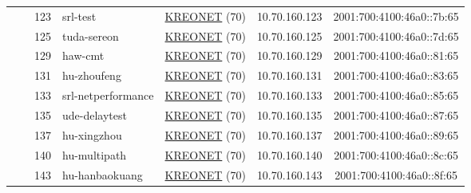 \begin{small}
\begin{center}
\begin{longtable}{|c|c|c|c|c|c|c|c|}
  &  & \tiny{123} & \multicolumn{1}{|l|}{\tiny{srl-test}} & \multicolumn{2}{|c|}{\tiny{\href{http://www.kreonet.net}{KREONET} (70)}} & \tiny{10.70.160.123} & \tiny{2001:700:4100:46a0::7b:65} \\* \cline{3-3}\cline{4-4}\cline{5-5}\cline{6-6}\cline{7-7}\cline{8-8}
  &  & \tiny{125} & \multicolumn{1}{|l|}{\tiny{tuda-sereon}} & \multicolumn{2}{|c|}{\tiny{\href{http://www.kreonet.net}{KREONET} (70)}} & \tiny{10.70.160.125} & \tiny{2001:700:4100:46a0::7d:65} \\* \cline{3-3}\cline{4-4}\cline{5-5}\cline{6-6}\cline{7-7}\cline{8-8}
  &  & \tiny{129} & \multicolumn{1}{|l|}{\tiny{haw-cmt}} & \multicolumn{2}{|c|}{\tiny{\href{http://www.kreonet.net}{KREONET} (70)}} & \tiny{10.70.160.129} & \tiny{2001:700:4100:46a0::81:65} \\* \cline{3-3}\cline{4-4}\cline{5-5}\cline{6-6}\cline{7-7}\cline{8-8}
  &  & \tiny{131} & \multicolumn{1}{|l|}{\tiny{hu-zhoufeng}} & \multicolumn{2}{|c|}{\tiny{\href{http://www.kreonet.net}{KREONET} (70)}} & \tiny{10.70.160.131} & \tiny{2001:700:4100:46a0::83:65} \\* \cline{3-3}\cline{4-4}\cline{5-5}\cline{6-6}\cline{7-7}\cline{8-8}
  &  & \tiny{133} & \multicolumn{1}{|l|}{\tiny{srl-netperformance}} & \multicolumn{2}{|c|}{\tiny{\href{http://www.kreonet.net}{KREONET} (70)}} & \tiny{10.70.160.133} & \tiny{2001:700:4100:46a0::85:65} \\* \cline{3-3}\cline{4-4}\cline{5-5}\cline{6-6}\cline{7-7}\cline{8-8}
  &  & \tiny{135} & \multicolumn{1}{|l|}{\tiny{ude-delaytest}} & \multicolumn{2}{|c|}{\tiny{\href{http://www.kreonet.net}{KREONET} (70)}} & \tiny{10.70.160.135} & \tiny{2001:700:4100:46a0::87:65} \\* \cline{3-3}\cline{4-4}\cline{5-5}\cline{6-6}\cline{7-7}\cline{8-8}
  &  & \tiny{137} & \multicolumn{1}{|l|}{\tiny{hu-xingzhou}} & \multicolumn{2}{|c|}{\tiny{\href{http://www.kreonet.net}{KREONET} (70)}} & \tiny{10.70.160.137} & \tiny{2001:700:4100:46a0::89:65} \\* \cline{3-3}\cline{4-4}\cline{5-5}\cline{6-6}\cline{7-7}\cline{8-8}
  &  & \tiny{140} & \multicolumn{1}{|l|}{\tiny{hu-multipath}} & \multicolumn{2}{|c|}{\tiny{\href{http://www.kreonet.net}{KREONET} (70)}} & \tiny{10.70.160.140} & \tiny{2001:700:4100:46a0::8c:65} \\* \cline{3-3}\cline{4-4}\cline{5-5}\cline{6-6}\cline{7-7}\cline{8-8}
  &  & \tiny{143} & \multicolumn{1}{|l|}{\tiny{hu-hanbaokuang}} & \multicolumn{2}{|c|}{\tiny{\href{http://www.kreonet.net}{KREONET} (70)}} & \tiny{10.70.160.143} & \tiny{2001:700:4100:46a0::8f:65} \\* \cline{3-3}\cline{4-4}\cline{5-5}\cline{6-6}\cline{7-7}\cline{8-8}

\end{longtable}
\end{center}
\end{small}
